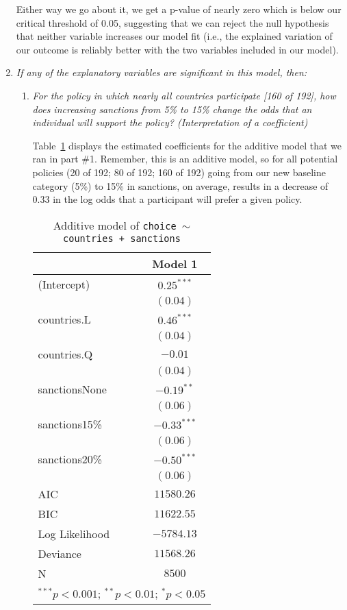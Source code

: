 \documentclass[12pt,letterpaper]{article}
\begin{document}
\begin{enumerate}
	Either way we go about it, we get a p-value of nearly zero which is below our critical threshold of 0.05, suggesting that we can reject the null hypothesis that neither variable increases our model fit (i.e., the explained variation of our outcome is reliably better with the two variables included in our model).
		
	\item
	\textit{If any of the explanatory variables are significant in this model, then:}
	\begin{enumerate}
		\item
		\textit{For the policy in which nearly all countries participate [160 of 192], how does increasing sanctions from 5\% to 15\% change the odds that an individual will support the policy? (Interpretation of a coefficient)}
		
		Table~\ref{table:coefficients} displays the estimated coefficients for the additive model that we ran in part \#1. Remember, this is an additive model, so for all potential policies (20 of 192; 80 of 192; 160 of 192) going from our new baseline category (5\%)  to 15\% in sanctions, on average, results in a decrease of 0.33 in the log odds that a participant will prefer a given policy.
		
		\begin{table}[b!]
			\caption{Additive model of \texttt{choice $\sim$ countries + sanctions}}
				\vspace{.25cm}
			\label{table:coefficients}
\centering
	\begin{adjustbox}{width=.3\textwidth}
\begin{tabular}{l c}
\hline
 & Model 1 \\
\hline
(Intercept)    & $0.25^{***}$  \\
               & $(0.04)$      \\
countries.L    & $0.46^{***}$  \\
               & $(0.04)$      \\
countries.Q    & $-0.01$       \\
               & $(0.04)$      \\
sanctionsNone  & $-0.19^{**}$  \\
               & $(0.06)$      \\
sanctions15\%  & $-0.33^{***}$ \\
               & $(0.06)$      \\
sanctions20\%  & $-0.50^{***}$ \\
               & $(0.06)$      \\
\hline
AIC            & $11580.26$    \\
BIC            & $11622.55$    \\
Log Likelihood & $-5784.13$    \\
Deviance       & $11568.26$    \\
N     & $8500$        \\
\hline
\multicolumn{2}{l}{\scriptsize{$^{***}p<0.001$; $^{**}p<0.01$; $^{*}p<0.05$}}
\end{tabular}
\end{adjustbox}
\end{table}
		


\end{enumerate}
\end{enumerate}
\end{document}
